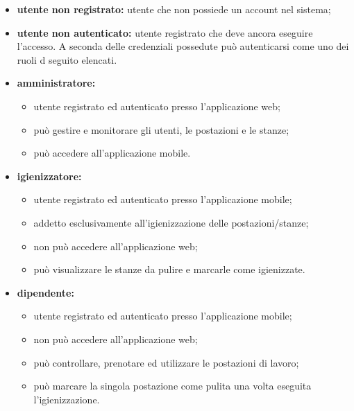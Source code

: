 
\begin{itemize}
    \item \textbf{utente non registrato:} utente che non possiede un account nel sistema;
    \item \textbf{utente non autenticato:} utente registrato che deve ancora eseguire l'accesso. A seconda delle credenziali possedute può autenticarsi come uno dei ruoli d seguito elencati.

    \item \textbf{amministratore:}
    \begin{itemize}
        \item utente registrato ed autenticato presso l'applicazione web; 
        \item pu\`{o} gestire e monitorare gli utenti, le postazioni e le stanze;
        \item può accedere all'applicazione mobile.
    \end{itemize}

    \item \textbf{igienizzatore:}
    \begin{itemize}
        \item utente registrato ed autenticato presso l'applicazione mobile;
        \item addetto esclusivamente all'igienizzazione delle postazioni/stanze; 
        \item non può accedere all'applicazione web; 
        \item può visualizzare le stanze da pulire e marcarle come igienizzate.
    \end{itemize} 

    \item \textbf{dipendente:}
    \begin{itemize}
        \item utente registrato ed autenticato presso l'applicazione mobile; 
        \item non può accedere all'applicazione web; 
        \item può controllare, prenotare ed utilizzare le postazioni di lavoro;
        \item può marcare la singola postazione come pulita una volta eseguita l'igienizzazione.
    \end{itemize} 
\end{itemize}
